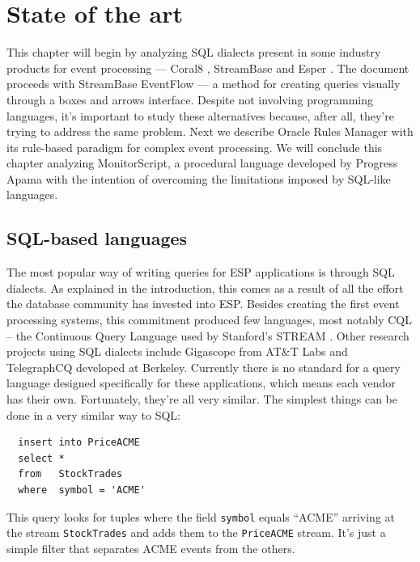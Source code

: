 \chapter{State of the art}
\label{chap:soa}

This chapter will begin by analyzing SQL dialects present in some
industry products for event processing --- Coral8 \cite{coral8:www},
StreamBase \cite{streambase:www} and Esper \cite{esper:www}. The
document proceeds with StreamBase EventFlow --- a method for creating
queries visually through a boxes and arrows interface. Despite not
involving programming languages, it's important to study these
alternatives because, after all, they're trying to address the same
problem. Next we describe Oracle Rules Manager with its rule-based
paradigm for complex event processing. We will conclude this chapter
analyzing MonitorScript, a procedural language developed by Progress
Apama with the intention of overcoming the limitations imposed by
SQL-like languages.

\section{SQL-based languages}
\label{sec:sql}

The most popular way of writing queries for ESP applications is
through SQL dialects. As explained in the introduction, this comes as
a result of all the effort the database community has invested into
ESP. Besides creating the first event processing systems, this
commitment produced few languages, most notably CQL -- the Continuous
Query Language \cite{cql} used by Stanford's STREAM
\cite{stream}. Other research projects using SQL dialects include
Gigascope \cite{gigascope} from AT\&T Labs and TelegraphCQ
\cite{telegraphcq} developed at Berkeley. Currently there is no
standard for a query language designed specifically for these
applications, which means each vendor has their own. Fortunately,
they're all very similar. The simplest things can be done in a very
similar way to SQL:

\lstset{
  language=CCL,
  columns=fullflexible,
  basicstyle=\tt,
  keywordstyle=[1]\bf,
  keywordstyle=[2]\it,
}

\begin{lstlisting}
  insert into PriceACME
  select *
  from   StockTrades
  where  symbol = 'ACME'
\end{lstlisting}

This query looks for tuples where the field \verb=symbol= equals
``ACME'' arriving at the stream \verb=StockTrades= and adds them to
the \verb=PriceACME= stream. It's just a simple filter that separates
ACME events from the others.

